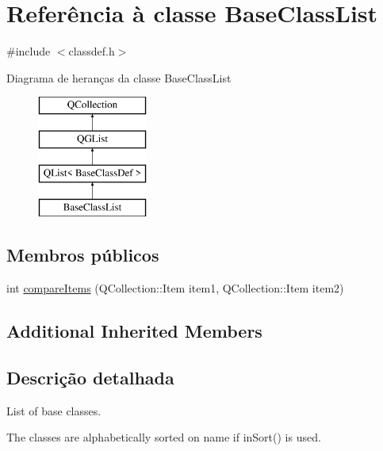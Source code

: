 \hypertarget{class_base_class_list}{\section{Referência à classe Base\-Class\-List}
\label{class_base_class_list}
}


{\ttfamily \#include $<$classdef.\-h$>$}

Diagrama de heranças da classe Base\-Class\-List\begin{figure}[H]
\begin{center}
\leavevmode
\includegraphics[height=4.000000cm]{class_base_class_list}
\end{center}
\end{figure}
\subsection*{Membros públicos}
\begin{DoxyCompactItemize}
\item 
int \hyperlink{class_base_class_list_a219450accf048597ffc7113ecde4c402}{compare\-Items} (Q\-Collection\-::\-Item item1, Q\-Collection\-::\-Item item2)
\end{DoxyCompactItemize}
\subsection*{Additional Inherited Members}


\subsection{Descrição detalhada}
List of base classes.

The classes are alphabetically sorted on name if in\-Sort() is used. 

